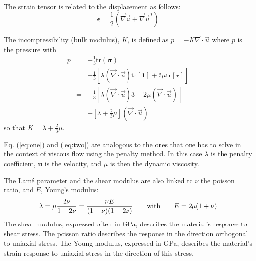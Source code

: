  

The strain tensor is related to the displacement as follows: 
\[
{\bm \epsilon} = \frac{1}{2}(\vec{\nabla}\vec{u} + \vec{\nabla}\vec{u}^T)
\]

The incompressibility (bulk modulus), $K$, is defined as $p=-K \vec{\nabla}\cdot\vec{u}$ 
where $p$ is the pressure with 
\begin{eqnarray}
p&=&-\frac{1}{3} \text{tr}({\bm \sigma}) \nonumber\\
 &=& -\frac{1}{3} [ \lambda (\vec{\nabla}\cdot\vec{u}) \text{tr}[{\bm 1}] + 2 \mu \text{tr}[{\bm \epsilon}]] \nonumber\\
 &=& -\frac{1}{3} [ \lambda (\vec{\nabla}\cdot\vec{u})  3  + 2 \mu  (\vec{\nabla}\cdot\vec{u}) ] \nonumber\\
 &=& -\left[ \lambda + \frac{2}{3} \mu \right] (\vec{\nabla}\cdot\vec{u})  
\end{eqnarray}
so that $K=\lambda+\frac{2}{3}\mu$.



\begin{remark}
Eq. (\ref{eq:one}) and (\ref{eq:two}) are analogous to the ones that one has to solve
in the context of viscous flow using the penalty method. In this case $\lambda$ is the penalty coefficient, 
${\bm u}$ is the velocity, and $\mu$ is then the dynamic viscosity.
\end{remark}


The Lam\'e parameter and the shear modulus are also linked to $\nu$ the poisson ratio, 
and $E$, Young's modulus:  
\[
\lambda=\mu\frac{2\nu}{1-2\nu}
=\frac{\nu E}{(1+\nu)(1-2\nu)}
\quad\quad
{\rm with}
\quad\quad
E=2\mu(1+\nu)
\]
The shear modulus, expressed often in GPa, describes the material's response to shear stress.
The poisson ratio describes the response in the direction orthogonal to uniaxial stress.
The Young modulus, expressed in GPa, describes the material's strain response to uniaxial stress in the 
direction of this stress.



